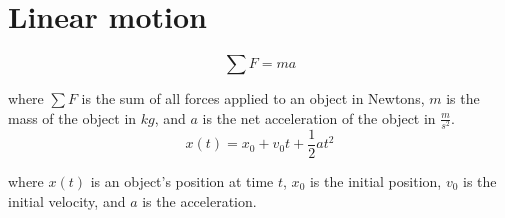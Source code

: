 \section{Linear motion}
\begin{equation*}
  \sum F = ma
\end{equation*}

where $\sum F$ is the sum of all forces applied to an object in Newtons, $m$ is
the mass of the object in $kg$, and $a$ is the net acceleration of the object in
$\frac{m}{s^2}$.
\begin{equation*}
  x(t) = x_0 + v_0 t + \frac{1}{2}at^2
\end{equation*}

where $x(t)$ is an object's position at time $t$, $x_0$ is the initial position,
$v_0$ is the initial velocity, and $a$ is the acceleration.
